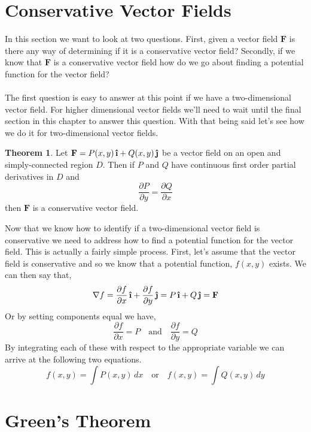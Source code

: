 \documentclass[10pt,reqno]{book}
\theoremstyle{definition}
\newtheorem{theorem}{Theorem}[section]
\renewcommand{\vec}[1]{\mathbf{#1}}
\newcommand{\uvec}[1]{\boldsymbol{\hat{\textbf{#1}}}}
\begin{document}
 	\section{Conservative Vector Fields}
 	In this section we want to look at two questions. First, given a vector field $ \vec{F} $ is there any way of determining if it is a conservative vector field? Secondly, if we know that $ \vec{F} $ is a conservative vector field how do we go about finding a potential function for the vector field? \\ \\
 	The first question is easy to answer at this point if we have a two-dimensional vector field. For higher dimensional vector fields we'll need to wait until the final section in this chapter to answer this question. With that being said let's see how we do it for two-dimensional vector fields.
 	\begin{theorem}
 		Let $ \vec{F} = P(x,y)\, \uvec{\i} + Q(x,y)\,\uvec{\j} $ be a vector field on an open and simply-connected region $ D $. Then if $ P $ and $ Q $ have continuous first order partial derivatives in $ D $ and
 		\[ \frac{\partial P}{\partial y} = \frac{\partial Q}{\partial x} \]
 		then $ \vec{F} $ is a conservative vector field. 
 	\end{theorem}
 	\noindent Now that we know how to identify if a two-dimensional vector field is conservative we need to address how to find a potential function for the vector field. This is actually a fairly simple process. First, let's assume that the vector field is conservative and so we know that a potential function, $ f(x,y) $ exists. We can then say that,
 	\[ \nabla f = \frac{\partial f}{\partial x}\, \uvec{\i} + \frac{\partial f}{\partial y}\, \uvec{\j} = P\,\uvec{\i} + Q\,\uvec{\j} = \vec{F} \]
 	Or by setting components equal we have,
 	\[ \frac{\partial f}{\partial x} = P \quad \text{and} \quad  \frac{\partial f}{\partial y} = Q \]
 	By integrating each of these with respect to the appropriate variable we can arrive at the following two equations.
 	\[ f(x,y) = \int P(x,y)\,dx \quad \text{or} \quad f(x,y) = \int Q(x,y)\,dy \]
 	
 	\section{Green's Theorem}
 	
\end{document}
